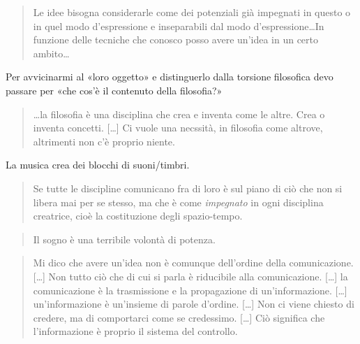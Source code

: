 \documentclass{../../lib/gs}
\begin{document}
\begin{quote}
\begin{sf}
\small
  Le idee bisogna considerarle come dei potenziali già impegnati in questo o in
  quel modo d'espressione e inseparabili dal modo d'espressione\ldots In funzione
  delle tecniche che conosco posso avere un'idea in un certo ambito\ldots
  \cite{deleuze2009}
  \end{sf}
\end{quote}

Per avvicinarmi al «loro oggetto» e distinguerlo dalla torsione filosofica devo
passare per «che cos'è il contenuto della filosofia?»

\begin{quote}
\begin{sf}
\small
  \ldots la filosofia è una disciplina che crea e inventa come le altre. Crea o
  inventa concetti. [\ldots] Ci vuole una necssità, in filosofia come altrove, altrimenti non c'è proprio niente.
  \cite{deleuze2009}
  \end{sf}
\end{quote}

La musica crea dei blocchi di suoni/timbri.

\begin{quote}
\begin{sf}
\small
  Se tutte le discipline comunicano fra di loro è sul piano di ciò che non si
  libera mai per se stesso, ma che è come \emph{impegnato} in ogni disciplina
  creatrice, cioè la costituzione degli spazio-tempo.
  \cite{deleuze2009}
  \end{sf}
\end{quote}

\begin{quote}
\begin{sf}
\small
  Il sogno è una terribile volontà di potenza.
  \cite{deleuze2009}
  \end{sf}
\end{quote}

\begin{quote}
\begin{sf}
\small
  Mi dico che avere un'idea non è comunque dell'ordine della comunicazione.
  [\ldots] Non tutto ciò che di cui si parla è riducibile alla comunicazione.
  [\ldots] la comunicazione è la trasmissione e la propagazione di
  un'informazione. [\ldots] un'informazione è un'insieme di parole d'ordine.
  [\ldots] Non ci viene chiesto di credere, ma di comportarci come se credessimo.
  [\ldots] Ciò significa che l'informazione è proprio il sistema del controllo.
  \cite{deleuze2009}
  \end{sf}
\end{quote}
\end{document}
